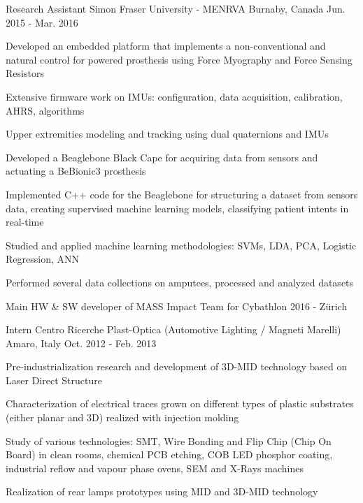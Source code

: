 

\begin{cventries}

	\cventry
	{Research Assistant}
	{Simon Fraser University - MENRVA \href{http://menrva.ensc.sfu.ca}{\faLink}}
	{Burnaby, Canada}
	{Jun. 2015 - Mar. 2016}
	{
		\begin{cvitems}
			\item {Developed an embedded platform that implements a non-conventional and natural control for powered prosthesis using Force Myography and Force Sensing Resistors}
			\item {Extensive firmware work on IMUs: configuration, data acquisition, calibration, AHRS, algorithms}
			\item {Upper extremities modeling and tracking using dual quaternions and IMUs}
			\item {Developed a Beaglebone Black Cape for acquiring data from sensors and actuating a BeBionic3 prosthesis}
			\item {Implemented C++ code for the Beaglebone for structuring a dataset from sensors data, creating supervised machine learning models, classifying patient intents in real-time}
			\item {Studied and applied machine learning methodologies: SVMs, LDA, PCA, Logistic Regression, ANN}
			\item {Performed several data collections on amputees, processed and analyzed datasets}
			\item {Main HW \& SW developer of MASS Impact Team for Cybathlon 2016 - Zürich \href{https://www.youtube.com/watch?v=_8Z5-_aYI-k}{\faYoutubePlay}}
		\end{cvitems}
	}

	\cventry
	{Intern}
	{Centro Ricerche Plast-Optica (Automotive Lighting / Magneti Marelli) \href{http://www.crpo.it/en/home/}{\faLink}}
	{Amaro, Italy}
	{Oct. 2012 - Feb. 2013}
	{
		\begin{cvitems}
			\item {Pre-industrialization research and development of 3D-MID technology based on Laser Direct Structure}
			\item {Characterization of electrical traces grown on different types of plastic substrates (either planar and 3D) realized with injection molding}
			\item {Study of various technologies: SMT, Wire Bonding and Flip Chip (Chip On Board) in clean rooms, chemical PCB etching, COB LED phosphor coating, industrial reflow and vapour phase ovens, SEM and X-Rays machines}
			\item {Realization of rear lamps prototypes using MID and 3D-MID technology}
		\end{cvitems}
	}

\end{cventries}
